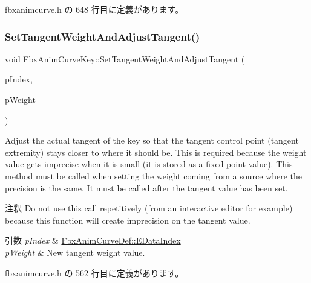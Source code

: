  fbxanimcurve.\+h の 648 行目に定義があります。

\mbox{\label{class_fbx_anim_curve_key_a9ea49dd21bb571575005dd678ecba501}} 
\subsubsection{\texorpdfstring{Set\+Tangent\+Weight\+And\+Adjust\+Tangent()}{SetTangentWeightAndAdjustTangent()}}
{\footnotesize\ttfamily void Fbx\+Anim\+Curve\+Key\+::\+Set\+Tangent\+Weight\+And\+Adjust\+Tangent (\begin{DoxyParamCaption}\item[{\hyperlink{class_fbx_anim_curve_def_a3be261d961f8226235529b148cf80300}{Fbx\+Anim\+Curve\+Def\+::\+E\+Data\+Index}}]{p\+Index,  }\item[{double}]{p\+Weight }\end{DoxyParamCaption})\hspace{0.3cm}{\ttfamily [inline]}}

Adjust the actual tangent of the key so that the tangent control point (tangent extremity) stays closer to where it should be. This is required because the weight value gets imprecise when it is small (it is stored as a fixed point value). This method must be called when setting the weight coming from a source where the precision is the same. It must be called after the tangent value has been set. \begin{DoxyRemark}{注釈}
Do not use this call repetitively (from an interactive editor for example) because this function will create imprecision on the tangent value. 
\end{DoxyRemark}

\begin{DoxyParams}{引数}
{\em p\+Index} & \hyperlink{class_fbx_anim_curve_def_a3be261d961f8226235529b148cf80300}{Fbx\+Anim\+Curve\+Def\+::\+E\+Data\+Index} \\
\hline
{\em p\+Weight} & New tangent weight value. \\
\hline
\end{DoxyParams}


 fbxanimcurve.\+h の 562 行目に定義があります。

